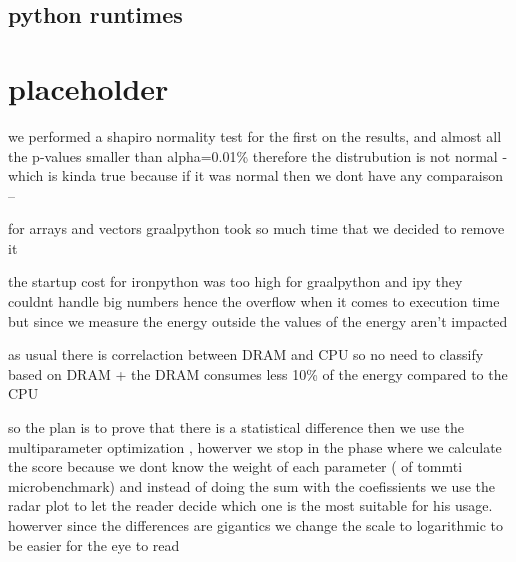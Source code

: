 \subsection{python runtimes}

\section{placeholder}
we performed a shapiro normality test for the first on the results, and almost all the p-values smaller than alpha=0.01\% 
therefore the distrubution is not normal - which is kinda true because if it was normal then we dont have any comparaison -- 

for arrays and vectors  graalpython took so much time that we decided to remove it 

the startup cost for ironpython was too high 
for graalpython and ipy they couldnt handle big numbers hence the overflow  when it comes to execution time 
but since we measure the energy outside the values of the energy aren't impacted 

as usual there is  correlaction between DRAM and CPU so no need to classify based on DRAM + the DRAM consumes less 10\% of the  energy compared to the CPU 

so the plan is to prove that there is a statistical difference 
then we use the multiparameter optimization , howerver we stop in the phase where we calculate the score 
because we dont know the weight of each parameter ( of tommti microbenchmark) and instead of doing the sum with the coefissients we use the radar plot to let the reader decide which one is the most suitable for his usage. howerver since the differences are gigantics we change the scale to logarithmic to be easier for the eye to read 



